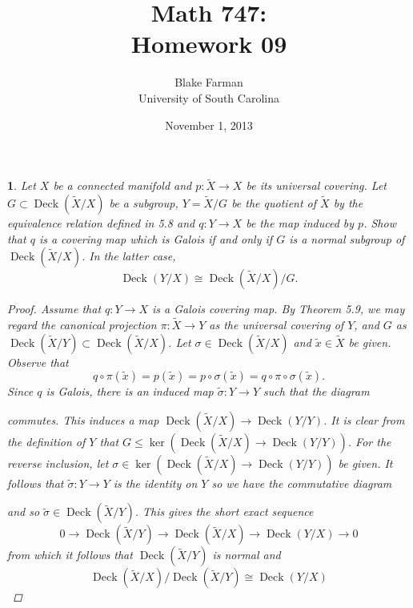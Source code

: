 \documentclass[10pt]{amsart}
\author{Blake Farman\\University of South Carolina}
\title{Math 747:\\Homework 09}
\date{November 1, 2013}
\begin{document}
\maketitle

\providecommand{\p}{\mathfrak{p}}
\providecommand{\m}{\mathfrak{m}}
\providecommand{\Deck}[1]{\operatorname{Deck}\left(#1\right)}

\newtheorem{thm}{}
\newtheorem{lem}{Lemma}
\newtheorem{prop}{Proposition}
\theoremstyle{definition}
\newtheorem{defn}{Definition}[thm]

\newcommand{\A}{\mathbb{A}}

\begin{thm}
	Let $X$ be a connected manifold and $p \colon \tilde{X} \rightarrow X$ be its universal covering.
	Let $G \subset \Deck{\tilde{X}/X}$ be a subgroup, $Y = \tilde{X}/G$ be the quotient of $\tilde{X}$ by the equivalence relation defined in 5.8 and $q \colon Y \rightarrow X$ be the map induced by $p$.
	Show that $q$ is a covering map which is Galois if and only if $G$ is a normal subgroup of $\Deck{\tilde{X}/X}$.
	In the latter case,
	$$\Deck{Y/X} \cong \Deck{\tilde{X}/X}/G.$$
	
	\begin{proof}
		Assume that $q \colon Y \rightarrow X$ is a Galois covering map.
		By Theorem 5.9, we may regard the canonical projection $\pi \colon \tilde{X} \rightarrow Y$ as the universal covering of $Y$, and $G$ as $\Deck{\tilde{X}/Y} \subset \Deck{\tilde{X}/X}$.
		Let $\sigma \in \Deck{\tilde{X}/X}$ and $\tilde{x} \in \tilde{X}$ be given.
		Observe that
		$$q \circ \pi (\tilde{x}) = p(\tilde{x}) = p \circ \sigma(\tilde{x}) = q \circ \pi \circ \sigma(\tilde{x}).$$
		Since $q$ is Galois, there is an induced map $\tilde{\sigma} \colon Y \rightarrow Y$ such that the diagram
		\begin{center}
		\end{center}
		commutes.
		This induces a map $\Deck{\tilde{X}/X} \rightarrow \Deck{Y/Y}$.
		It is clear from the definition of $Y$ that $G \leq \ker\left({\Deck{\tilde{X}/X} \rightarrow \Deck{Y/Y}}\right)$.
		For the reverse inclusion, let $\sigma \in \ker\left({\Deck{\tilde{X}/X} \rightarrow \Deck{Y/Y}}\right)$ be given.
		It follows that $\tilde{\sigma} \colon Y \rightarrow Y$ is the identity on $Y$ so we have the commutative diagram
		\begin{center}
		\end{center}
		and so $\tilde{\sigma} \in \Deck{\tilde{X}/Y}$.
		This gives the short exact sequence
		$$0 \rightarrow \Deck{\tilde{X}/Y} \rightarrow \Deck{\tilde{X}/X} \rightarrow \Deck{Y/X} \rightarrow 0$$
		from which it follows that $\Deck{\tilde{X}/Y}$ is normal and 
		$$\Deck{\tilde{X}/X}/\Deck{\tilde{X}/Y} \cong \Deck{Y/X}$$
		

\end{proof}
\end{thm}
\end{document}
